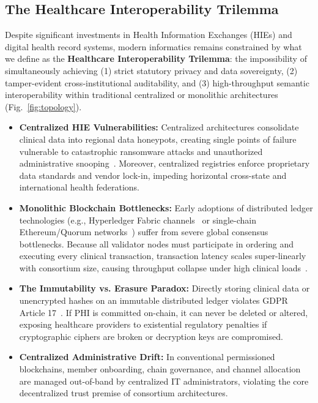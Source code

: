 \documentclass[journal]{IEEEtran}
\theoremstyle{definition}
\begin{document}
\subsection{The Healthcare Interoperability Trilemma}
Despite significant investments in Health Information Exchanges (HIEs) and digital health record systems, modern informatics remains constrained by what we define as the \textbf{Healthcare Interoperability Trilemma}: the impossibility of simultaneously achieving (1) strict statutory privacy and data sovereignty, (2) tamper-evident cross-institutional auditability, and (3) high-throughput semantic interoperability within traditional centralized or monolithic architectures (Fig.~\ref{fig:topology}).

\begin{itemize}
    \item \textbf{Centralized HIE Vulnerabilities:} Centralized architectures consolidate clinical data into regional data honeypots, creating single points of failure vulnerable to catastrophic ransomware attacks and unauthorized administrative snooping~\cite{esposito2018blockchain, sharma2020security}. Moreover, centralized registries enforce proprietary data standards and vendor lock-in, impeding horizontal cross-state and international health federations.
    \item \textbf{Monolithic Blockchain Bottlenecks:} Early adoptions of distributed ledger technologies (e.g., Hyperledger Fabric channels~\cite{androulaki2018hyperledger} or single-chain Ethereum/Quorum networks~\cite{wood2014ethereum, ekblaw2016medrec}) suffer from severe global consensus bottlenecks. Because all validator nodes must participate in ordering and executing every clinical transaction, transaction latency scales super-linearly with consortium size, causing throughput collapse under high clinical loads~\cite{gordon2018blockchain}.
    \item \textbf{The Immutability vs. Erasure Paradox:} Directly storing clinical data or unencrypted hashes on an immutable distributed ledger violates GDPR Article 17~\cite{politou2018forgetting, finck2018blockchain}. If PHI is committed on-chain, it can never be deleted or altered, exposing healthcare providers to existential regulatory penalties if cryptographic ciphers are broken or decryption keys are compromised.
    \item \textbf{Centralized Administrative Drift:} In conventional permissioned blockchains, member onboarding, chain governance, and channel allocation are managed out-of-band by centralized IT administrators, violating the core decentralized trust premise of consortium architectures.
\end{itemize}
\end{document}
